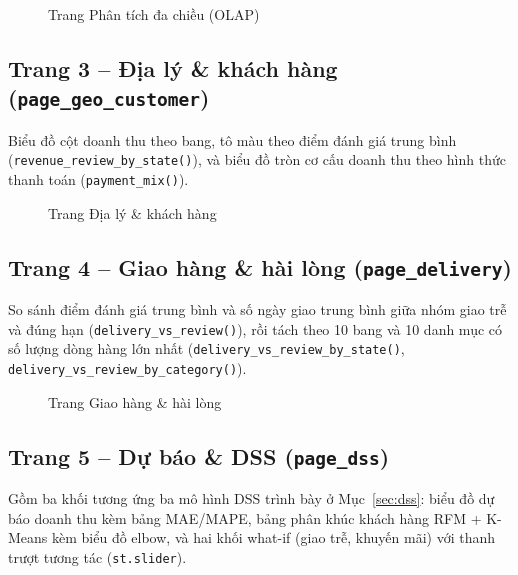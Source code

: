 \documentclass[12pt,a4paper]{article}
\newcommand{\code}[1]{\texttt{\small #1}}
\begin{document}
\begin{figure}[h]
\centering
{}
\caption{Trang Phân tích đa chiều (OLAP)}\label{fig:ss-olap}
\end{figure}

\subsection{Trang 3 -- Địa lý \& khách hàng (\code{page\_geo\_customer})}
Biểu đồ cột doanh thu theo bang, tô màu theo điểm đánh giá trung bình (\code{revenue\_review\_by\_state()}),
và biểu đồ tròn cơ cấu doanh thu theo hình thức thanh toán (\code{payment\_mix()}).

\begin{figure}[h]
\centering
{}
\caption{Trang Địa lý \& khách hàng}\label{fig:ss-geo}
\end{figure}

\subsection{Trang 4 -- Giao hàng \& hài lòng (\code{page\_delivery})}
So sánh điểm đánh giá trung bình và số ngày giao trung bình giữa nhóm giao trễ và đúng hạn
(\code{delivery\_vs\_review()}), rồi tách theo 10 bang và 10 danh mục có số lượng dòng hàng lớn nhất
(\code{delivery\_vs\_review\_by\_state()}, \code{delivery\_vs\_review\_by\_category()}).

\begin{figure}[h]
\centering
{}
\caption{Trang Giao hàng \& hài lòng}\label{fig:ss-delivery}
\end{figure}

\subsection{Trang 5 -- Dự báo \& DSS (\code{page\_dss})}
Gồm ba khối tương ứng ba mô hình DSS trình bày ở Mục~\ref{sec:dss}: biểu đồ dự báo doanh thu kèm bảng MAE/MAPE, bảng
phân khúc khách hàng RFM + K-Means kèm biểu đồ elbow, và hai khối what-if (giao trễ, khuyến mãi) với thanh
trượt tương tác (\code{st.slider}).
\end{document}

